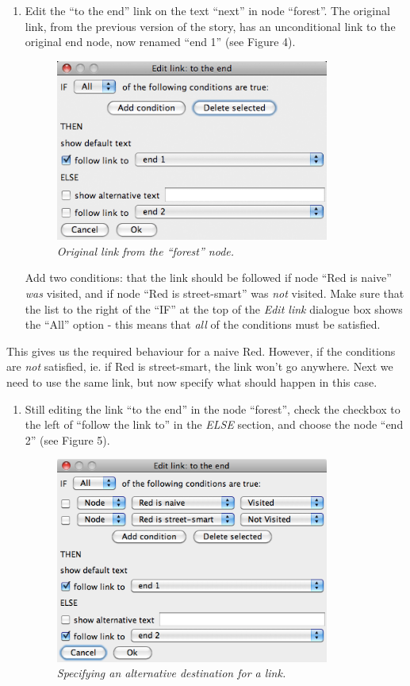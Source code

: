 \documentclass{article}
\begin{document}
\begin{enumerate}
  \item Edit the ``to the end'' link on the text ``next'' in node ``forest''.
  The original link, from the previous version of the story, has an
  unconditional link to the original end node, now renamed ``end 1'' (see
  Figure 4).
\begin{figure}[h]
  \centering
  \includegraphics[width=9cm]{images/hypedyn-tutorial-2-figure-4}
  \caption{\textit{Original link from the ``forest'' node.}}
\end{figure} 
  Add two conditions: that the link should be followed if node ``Red is
  naive'' \textit{was} visited, and if node ``Red is street-smart'' was
  \textit{not} visited. Make sure that the list to the right of the ``IF'' at
  the top of the \textit{Edit link} dialogue box shows the ``All'' option -
  this means that \textit{all} of the conditions must be satisfied.
\end{enumerate}
This gives us the required behaviour for a naive Red. However, if the
conditions are \textit{not} satisfied, ie. if Red is street-smart, the link
won't go anywhere. Next we need to use the same link, but now specify what
should happen in this case.

\begin{enumerate}
  \item Still editing the link ``to the end'' in the node ``forest'', check the
  checkbox to the left of ``follow the link to'' in the \textit{ELSE} section,
  and choose the node ``end 2'' (see Figure 5).
\begin{figure}[h]
  \centering
  \includegraphics[width=9cm]{images/hypedyn-tutorial-2-figure-5}
  \caption{\textit{Specifying an alternative destination for a link.}}
\end{figure} 
\end{enumerate}
\end{document}
